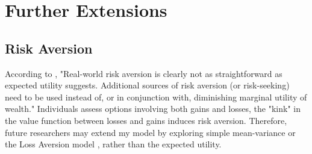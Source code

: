










\section{Further Extensions}

\subsection{Risk Aversion}
\noindent According to \cite{o2018modeling}, "Real-world risk aversion is clearly not as straightforward as expected utility suggests. Additional sources of risk aversion (or risk-seeking) need to be used instead of, or in conjunction with, diminishing marginal utility of wealth." Individuals assess options involving both gains and losses, the "kink" in the value function between losses and gains induces risk aversion. Therefore, future researchers may extend my model by exploring simple mean-variance or the Loss Aversion model \citep{kahneman1979prospect}, rather than the expected utility.


